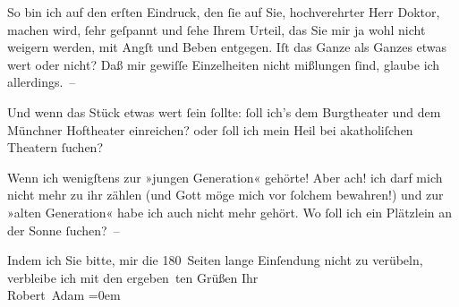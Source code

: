 \pstart
           So bin ich auf den erſten Eindruck, den ſie auf Sie, hochverehrter Herr Doktor,
               machen wird, ſehr geſpannt und ſehe Ihrem Urteil, das Sie mir ja wohl nicht weigern
               werden, mit Angſt und Beben entgegen. Iſt das Ganze als Ganzes etwas wert oder nicht?
               Daß mir gewiſſe Einzelheiten nicht mißlungen ſind, glaube ich allerdings. –\pend
           
\pstart
           Und wenn das Stück etwas wert {\pb}ſein ſollte: ſoll ich’s
               dem Burgtheater und dem Münchner Hoftheater einreichen? oder ſoll ich mein Heil bei
               akatholiſchen Theatern ſuchen?\pend
           
\pstart
           Wenn ich wenigſtens zur »jungen Generation« gehörte! Aber ach! ich darf mich nicht
               mehr zu ihr zählen (und Gott möge mich vor ſolchem bewahren!) und zur »alten
               Generation« habe ich auch nicht mehr gehört. Wo ſoll ich ein Plätzlein an der Sonne
               ſuchen? –\pend
           
\pstart
           Indem ich Sie bitte, mir die 180 Seiten lange Einſendung nicht zu verübeln,
               verbleibe ich mit den ergeben ten Grüßen Ihr{\\[\baselineskip]}\spacefill\mbox{Robert Adam}\pend
           \leftskip=0em{}\endnumbering{}  
      